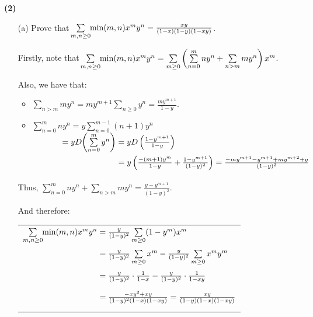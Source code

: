\documentclass{book}
\newcommand{\exOne}{%
   \color{Purple}%
   \fontsize{13}{15}\selectfont%
}
\newenvironment{myIndent}{%
   \begin{adjustwidth}{2.5em}{0em}%
}{%
   \end{adjustwidth}%
}
\newcommand{\blab}[1]{\textbf{#1}}
\newcommand{\retTwo}{\hfill\bigbreak}
\begin{document}
\blab{(2)} 
\begin{enumerate}
   \item[(a)] Prove that $\hspace{-0.25em}\sum\limits_{m,n \geq 0}\hspace{-0.25em}\min(m,n)x^my^n = \frac{xy}{(1-x)(1-y)(1-xy)}$.
   
   \begin{myIndent}\exOne
      Firstly, note that $\hspace{-0.25em}\sum\limits_{m,n \geq 0}\hspace{-0.25em}\min(m,n)x^my^n = \sum\limits_{m \geq 0}\left(\sum\limits_{n=0}^{m}ny^n + \sum\limits_{n > m}my^n\right)x^m$.\retTwo

      Also, we have that:
      \begin{itemize}
         \item $\sum\limits_{n > m}m y^n = my^{m + 1} \sum\limits_{n \geq 0}y^n = \frac{my^{m+1}}{1 - y}$.
         \item $\sum\limits_{n=0}^m ny^n = y\sum\limits_{n=0}^{m-1} (n+1)y^{n}$\\
         $\phantom{\sum\limits_{n=0}^m ny^n } = yD\hspace{-0.2em}\left(\sum\limits_{n=0}^m y^n\right) = yD\left(\frac{1 - y^{m+1}}{1- y}\right)$\\
         $\phantom{\sum\limits_{n=0}^m ny^n = yD\hspace{-0.2em}\left(\sum\limits_{n=0}^m y^n\right)} = y\left(\frac{-(m + 1)y^m}{1 - y} + \frac{1 - y^{m+1}}{(1-y)^2}\right) = \frac{-my^{m+1} - y^{m+1}+my^{m+2}+y}{(1-y)^2}$\retTwo
      \end{itemize}

      Thus, $\sum\limits_{n=0}^{m}ny^n + \sum\limits_{n > m}my^n = \frac{y - y^{m+1}}{(1-y)^2}$.\retTwo

      And therefore:
      
      {\centering 
      \begin{tabular}{l}
         $\sum\limits_{m,n \geq 0}\hspace{-0.25em}\min(m,n)x^my^n = \frac{y}{(1-y)^2}\sum\limits_{m \geq 0}(1 - y^m)x^m$\\ [14pt]
         $\phantom{\sum\limits_{m,n \geq 0}\hspace{-0.25em}\min(m,n)x^my^n} = \frac{y}{(1-y)^2}\sum\limits_{m \geq 0}x^m - \frac{y}{(1-y)^2}\sum\limits_{m \geq 0}x^my^m$\\ [14pt]
         $\phantom{\sum\limits_{m,n \geq 0}\hspace{-0.25em}\min(m,n)x^my^n} = \frac{y}{(1-y)^2}\cdot\frac{1}{1-x} - \frac{y}{(1-y)^2}\cdot\frac{1}{1-xy}$\\ [2pt]
         $\phantom{\sum\limits_{m,n \geq 0}\hspace{-0.25em}\min(m,n)x^my^n} = \frac{-xy^2 + xy}{(1-y)^2(1-x)(1-xy)} = \frac{xy}{(1-y)(1-x)(1-xy)}$
      \end{tabular}\retTwo\par}
   \end{myIndent}
   

\end{enumerate}
\end{document}
